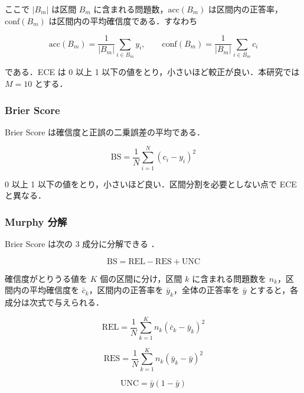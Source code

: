 ここで $|B_m|$ は区間 $B_m$ に含まれる問題数，$\mathrm{acc}(B_m)$ は区間内の正答率，$\mathrm{conf}(B_m)$ は区間内の平均確信度である．すなわち

\begin{equation}
\mathrm{acc}(B_m) = \frac{1}{|B_m|}\sum_{i \in B_m} y_i, \qquad
\mathrm{conf}(B_m) = \frac{1}{|B_m|}\sum_{i \in B_m} c_i
\end{equation}

である．ECE は 0 以上 1 以下の値をとり，小さいほど較正が良い．本研究では$M = 10$ とする．

\subsubsection{Brier Score}

Brier Score は確信度と正誤の二乗誤差の平均である．

\begin{equation}
\mathrm{BS} = \frac{1}{N} \sum_{i=1}^{N} (c_i - y_i)^2
\end{equation}

0 以上 1 以下の値をとり，小さいほど良い．区間分割を必要としない点で ECE と異なる．

\subsubsection{Murphy 分解}

Brier Score は次の 3 成分に分解できる \cite{murphy1973partition}．

\begin{equation}
\mathrm{BS} = \mathrm{REL} - \mathrm{RES} + \mathrm{UNC}
\end{equation}

確信度がとりうる値を $K$ 個の区間に分け，区間 $k$ に含まれる問題数を $n_k$，区間内の平均確信度を $\bar{c}_k$，区間内の正答率を $\bar{y}_k$，全体の正答率を $\bar{y}$ とすると，各成分は次式で与えられる．

\begin{equation}
\mathrm{REL} = \frac{1}{N} \sum_{k=1}^{K} n_k (\bar{c}_k - \bar{y}_k)^2
\end{equation}

\begin{equation}
\mathrm{RES} = \frac{1}{N} \sum_{k=1}^{K} n_k (\bar{y}_k - \bar{y})^2
\end{equation}

\begin{equation}
\mathrm{UNC} = \bar{y}(1 - \bar{y})
\end{equation}

